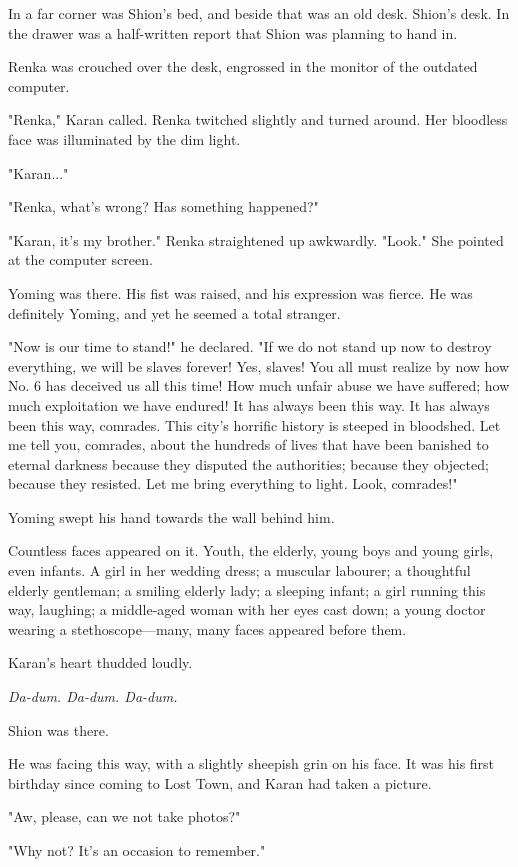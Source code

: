 In a far corner was Shion's bed, and beside that was an old desk.
Shion's desk. In the drawer was a half-written report that Shion was
planning to hand in.

Renka was crouched over the desk, engrossed in the monitor of the
outdated computer.

"Renka," Karan called. Renka twitched slightly and turned around. Her
bloodless face was illuminated by the dim light.

"Karan..."

"Renka, what's wrong? Has something happened?"

"Karan, it's my brother." Renka straightened up awkwardly. "Look." She
pointed at the computer screen.

Yoming was there. His fist was raised, and his expression was fierce. He
was definitely Yoming, and yet he seemed a total stranger.

"Now is our time to stand!" he declared. "If we do not stand up now to
destroy everything, we will be slaves forever! Yes, slaves! You all must
realize by now how No. 6 has deceived us all this time! How much unfair
abuse we have suffered; how much exploitation we have endured! It has
always been this way. It has always been this way, comrades. This city's
horrific history is steeped in bloodshed. Let me tell you, comrades,
about the hundreds of lives that have been banished to eternal darkness
because they disputed the authorities; because they objected; because
they resisted. Let me bring everything to light. Look, comrades!"

Yoming swept his hand towards the wall behind him.

Countless faces appeared on it. Youth, the elderly, young boys and young
girls, even infants. A girl in her wedding dress; a muscular labourer; a
thoughtful elderly gentleman; a smiling elderly lady; a sleeping infant;
a girl running this way, laughing; a middle-aged woman with her eyes
cast down; a young doctor wearing a stethoscope---many, many faces
appeared before them.

Karan's heart thudded loudly.

\emph{Da-dum. Da-dum. Da-dum.}

Shion was there.

He was facing this way, with a slightly sheepish grin on his face. It
was his first birthday since coming to Lost Town, and Karan had taken a
picture.

"Aw, please, can we not take photos?"

"Why not? It's an occasion to remember."


